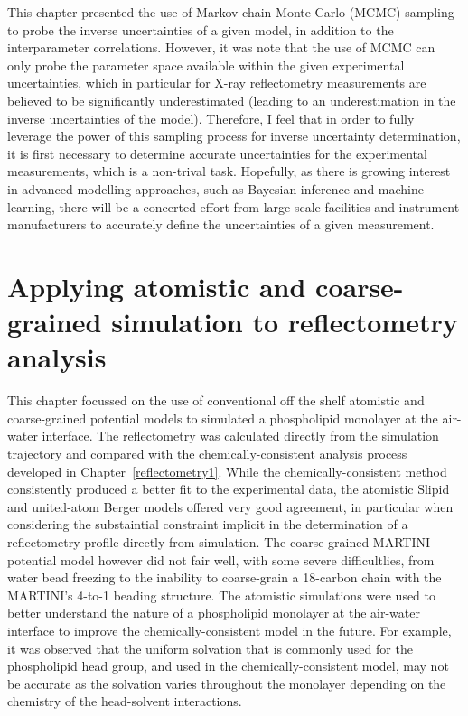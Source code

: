 This chapter presented the use of Markov chain Monte Carlo (MCMC) sampling to probe the inverse uncertainties of a given model, in addition to the interparameter correlations.
However, it was note that the use of MCMC can only probe the parameter space available within the given experimental uncertainties, which in particular for X-ray reflectometry measurements are believed to be significantly underestimated (leading to an underestimation in the inverse uncertainties of the model).
Therefore, I feel that in order to fully leverage the power of this sampling process for inverse uncertainty determination, it is first necessary to determine accurate uncertainties for the experimental measurements, which is a non-trival task.
Hopefully, as there is growing interest in advanced modelling approaches, such as Bayesian inference and machine learning, there will be a concerted effort from large scale facilities and instrument manufacturers to accurately define the uncertainties of a given measurement.

\section{Applying atomistic and coarse-grained simulation to reflectometry analysis}
This chapter focussed on the use of conventional off the shelf atomistic and coarse-grained potential models to simulated a phospholipid monolayer at the air-water interface.
The reflectometry was calculated directly from the simulation trajectory and compared with the chemically-consistent analysis process developed in Chapter~\ref{reflectometry1}.
While the chemically-consistent method consistently produced a better fit to the experimental data, the atomistic Slipid and united-atom Berger models offered very good agreement, in particular when considering the substaintial constraint implicit in the determination of a reflectometry profile directly from simulation.
The coarse-grained MARTINI potential model however did not fair well, with some severe difficultlies, from water bead freezing to the inability to coarse-grain a 18-carbon chain with the MARTINI's 4-to-1 beading structure.
The atomistic simulations were used to better understand the nature of a phospholipid monolayer at the air-water interface to improve the chemically-consistent model in the future.
For example, it was observed that the uniform solvation that is commonly used for the phospholipid head group, and used in the chemically-consistent model, may not be accurate as the solvation varies throughout the monolayer depending on the chemistry of the head-solvent interactions.

